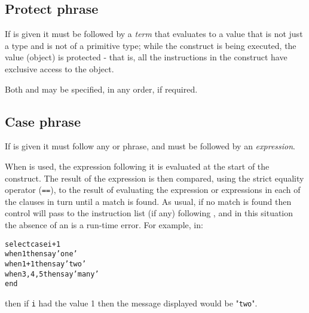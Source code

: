 \subsection{Protect phrase}
 
If  is given it must be followed by a \emph{term}
that evaluates to a value that is not just a type and is not of a
primitive type;
while the  construct is being executed, the value
(object) is protected - that is, all the instructions in the
 construct have exclusive access to the object.
 
Both  and  may be specified, in any order,
if required.
\subsection{Case phrase}
 
If  is given it must follow any  or
 phrase, and must be followed by an
\emph{expression}.
 
When  is used, the expression following it is evaluated at
the start of the  construct.
The result of the expression is then compared, using the strict equality
operator (\texttt{==}), to the result of evaluating the expression
or expressions in each of the  clauses in turn until
a match is found.  As usual, if no match is found then control
will pass to the instruction list (if any) following
, and in this situation the absence of an
 is a run-time error.
 For example, in:
\begin{alltt}
select case i+1
  when 1 then say 'one'
  when 1+1 then say 'two'
  when 3, 4, 5 then say 'many'
end
\end{alltt}
then if \texttt{i} had the value 1 then the message displayed would be
"\texttt{two}".
 
